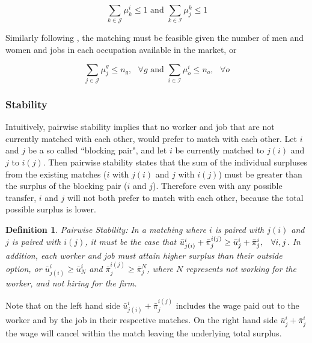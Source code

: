 \documentclass[12pt]{article}
\newtheorem{definition}{Definition}
\begin{document}
$$ \sum_{k \in \mathcal{J}} \mu^i_k \leq 1 \text{ and }  \sum_{k \in \mathcal{I}} \mu^k_j \leq 1$$

Similarly following , the matching must be feasible given the number of men and women and jobs in each occupation available in the market, or

$$ \sum_{j \in \mathcal{J}} \mu^g_j \leq n_g, \text{ } \forall g \text{ and }  \sum_{i \in \mathcal{I}} \mu^i_o \leq n_o, \text{ } \forall o$$

\subsubsection{Stability}

Intuitively, pairwise stability implies that no worker and job that are not currently matched with each other, would prefer to match with each other. Let $i$ and $j$ be a so called ``blocking pair", and let $i$ be currently matched to $j(i)$ and $j$ to $i(j)$. Then pairwise stability states that the sum of the individual surpluses from the existing matches ($i$ with $j(i)$ and $j$ with $i(j)$) must be greater than the surplus of the blocking pair ($i$ and $j$). Therefore even with any possible transfer, $i$ and $j$ will not both prefer to match with each other, because the total possible surplus is lower.

\begin{definition}
Pairwise Stability: In a matching where $i$ is paired with $j(i)$ and $j$ is paired with $i(j)$, it must be the case that $\bar{u}^{i}_{j(i)}+ \bar{\pi}^{i(j)}_j \geq \bar{u}^{i}_{j} + \bar{\pi}^{i}_j, \hspace{3mm}  \forall i,j$. In addition, each worker and job must attain higher surplus than their outside option, or $\bar{u}^{i}_{j(i)} \geq \bar{u}^{i}_{N}$ and $\bar{\pi}^{i(j)}_j \geq \bar{\pi}^{N}_j $, where $N$ represents not working for the worker, and not hiring for the firm.
 \end{definition}
 
Note that on the left hand side $\bar{u}^{i}_{j(i)}+ \bar{\pi}^{i(j)}_j$ includes the wage paid out to the worker and by the job in their respective matches. On the right hand side $\bar{u}^{i}_{j} + \bar{\pi}^{i}_j$ the wage will cancel within the match leaving the underlying total surplus. 
\end{document}
